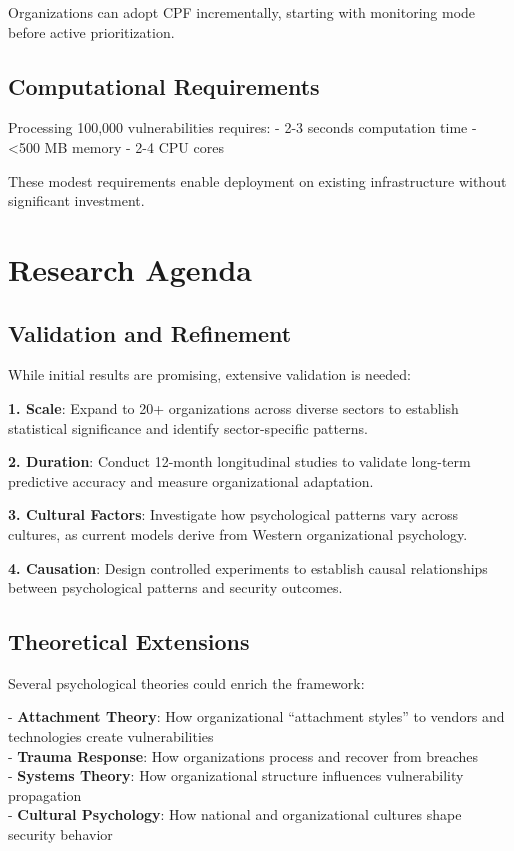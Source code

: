 \documentclass[11pt,a4paper]{article}
\begin{document}
Organizations can adopt CPF incrementally, starting with monitoring mode before active prioritization.

\subsection{Computational Requirements}

Processing 100,000 vulnerabilities requires:
- 2-3 seconds computation time
- <500 MB memory
- 2-4 CPU cores

These modest requirements enable deployment on existing infrastructure without significant investment.

\section{Research Agenda}

\subsection{Validation and Refinement}

While initial results are promising, extensive validation is needed:

\textbf{1. Scale}: Expand to 20+ organizations across diverse sectors to establish statistical significance and identify sector-specific patterns.

\textbf{2. Duration}: Conduct 12-month longitudinal studies to validate long-term predictive accuracy and measure organizational adaptation.

\textbf{3. Cultural Factors}: Investigate how psychological patterns vary across cultures, as current models derive from Western organizational psychology.

\textbf{4. Causation}: Design controlled experiments to establish causal relationships between psychological patterns and security outcomes.

\subsection{Theoretical Extensions}

Several psychological theories could enrich the framework:

- \textbf{Attachment Theory}: How organizational ``attachment styles'' to vendors and technologies create vulnerabilities\\
- \textbf{Trauma Response}: How organizations process and recover from breaches\\
- \textbf{Systems Theory}: How organizational structure influences vulnerability propagation\\
- \textbf{Cultural Psychology}: How national and organizational cultures shape security behavior\\
\end{document}
